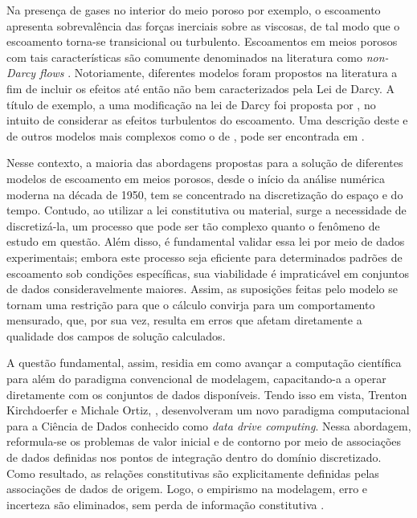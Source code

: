 Na presença de gases no interior do meio poroso por exemplo, o escoamento apresenta sobrevalência das forças inerciais sobre as viscosas, de tal modo que o escoamento torna-se transicional ou turbulento. Escoamentos em meios porosos com tais características são comumente denominados na literatura como \textit{non-Darcy flows} \cite{McPhee2015}. Notoriamente, diferentes modelos foram propostos na literatura a fim de incluir os efeitos até então não bem caracterizados pela Lei de Darcy. A título de exemplo, a uma modificação na lei de Darcy foi proposta por \cite{Forchheimer1901}, no intuito de considerar as efeitos turbulentos do escoamento. Uma descrição deste e de outros modelos mais complexos como o de \cite{Klikenberg1941}, pode ser encontrada em \cite{McPhee2015}.

Nesse contexto, a maioria das abordagens propostas para a solução de diferentes modelos de escoamento em meios porosos, desde o início da análise numérica moderna na década de 1950, tem se concentrado na discretização do espaço e do tempo. Contudo, ao utilizar a lei constitutiva ou material, surge a necessidade de discretizá-la, um processo que pode ser tão complexo quanto o fenômeno de estudo em questão. Além disso, é fundamental validar essa lei por meio de dados experimentais; embora este processo seja eficiente para determinados padrões de escoamento sob condições específicas, sua viabilidade é impraticável em conjuntos de dados consideravelmente maiores. Assim, as suposições feitas pelo modelo se tornam uma restrição para que o cálculo convirja para um comportamento mensurado, que, por sua vez, resulta em erros que afetam diretamente a qualidade dos campos de solução calculados.

A questão fundamental, assim, residia em como avançar a computação científica para além do paradigma convencional de modelagem, capacitando-a a operar diretamente com os conjuntos de dados disponíveis. Tendo isso em vista, Trenton Kirchdoerfer e Michale Ortiz, \cite{Kirchdoerfer2018,Kirchdoerfer2016}, desenvolveram um novo paradigma computacional para a Ciência de Dados conhecido como \textit{data drive computing}. Nessa abordagem, reformula-se os problemas de valor inicial e de contorno por meio de associações de dados definidas nos pontos de integração dentro do domínio discretizado. Como resultado, as relações constitutivas são explicitamente definidas pelas associações de dados de origem. Logo, o empirismo na modelagem, erro e incerteza são eliminados, sem perda de informação constitutiva \cite{Kirchdoerfer2016}.

